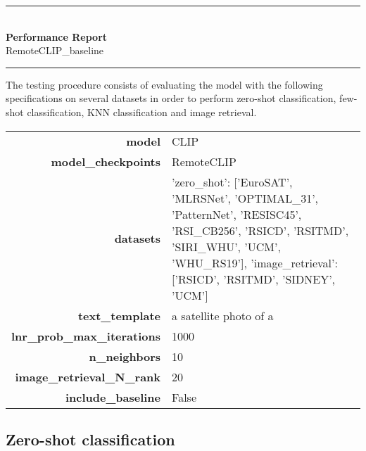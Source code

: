 \documentclass[11pt]{article}
\begin{document}
\thispagestyle{empty} 

\newcommand{\HRule}{\rule{\linewidth}{0.3mm}}
\begin{centering}
\HRule \\[0.5cm]
{\Huge \bfseries Performance Report}\\[0.3cm] 
{\Large RemoteCLIP\_baseline}\\[0.3cm] 
\HRule
\vspace{0.5cm}
\end{centering}

\noindent
The testing procedure consists of evaluating the model with the following specifications on several datasets in order to perform zero-shot classification, few-shot classification, KNN classification and image retrieval.

\begin{table}[H]
\centering
\begin{tabularx}{\columnwidth}{r|X}
\textbf{model} & CLIP \\
\textbf{model\_checkpoints} & RemoteCLIP \\
\textbf{datasets} & {'zero\_shot': ['EuroSAT', 'MLRSNet', 'OPTIMAL\_31', 'PatternNet', 'RESISC45', 'RSI\_CB256', 'RSICD', 'RSITMD', 'SIRI\_WHU', 'UCM', 'WHU\_RS19'], 'image\_retrieval': ['RSICD', 'RSITMD', 'SIDNEY', 'UCM']} \\
\textbf{text\_template} & a satellite photo of a  \\
\textbf{lnr\_prob\_max\_iterations} & 1000 \\
\textbf{n\_neighbors} & 10 \\
\textbf{image\_retrieval\_N\_rank} & 20 \\
\textbf{include\_baseline} & False \\
\end{tabularx}

\end{table}



\subsection*{Zero-shot classification}
\end{document}
